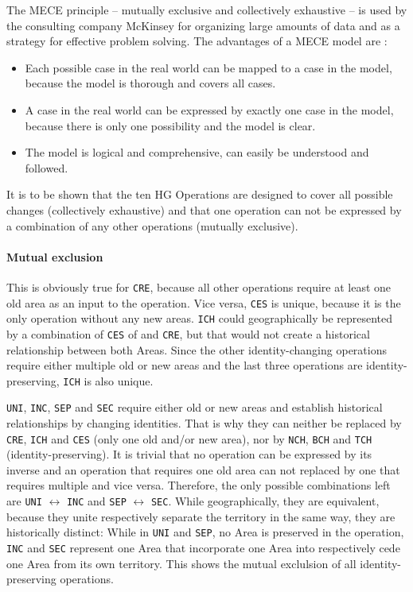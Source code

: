 The MECE principle -- mutually exclusive and collectively exhaustive -- is used by the consulting company McKinsey for organizing large amounts of data and as a strategy for effective problem solving. The advantages of a MECE model are \cite{mece}:
\begin{itemize}
  \item Each possible case in the real world can be mapped to a case in the model, because the model is thorough and covers all cases.
  \item A case in the real world can be expressed by exactly one case in the model, because there is only one possibility and the model is clear.
  \item The model is logical and comprehensive, can easily be understood and followed.
\end{itemize}

It is to be shown that the ten HG Operations are designed to cover all possible changes (collectively exhaustive) and that one operation can not be expressed by a combination of any other operations (mutually exclusive).


\paragraph{Mutual exclusion} %
\label{par:mutual_exclusion}

This is obviously true for \texttt{CRE}, because all other operations require at least one old area as an input to the operation. Vice versa, \texttt{CES} is unique, because it is the only operation without any new areas. \texttt{ICH} could geographically be represented by a combination of \texttt{CES} of and \texttt{CRE}, but that would not create a historical relationship between both Areas. Since the other identity-changing operations require either multiple old or new areas and the last three operations are identity-preserving, \texttt{ICH} is also unique.

\texttt{UNI}, \texttt{INC}, \texttt{SEP} and \texttt{SEC} require either old or new areas and establish historical relationships by changing identities. That is why they can neither be replaced by \texttt{CRE}, \texttt{ICH} and \texttt{CES} (only one old and/or new area), nor by \texttt{NCH}, \texttt{BCH} and \texttt{TCH} (identity-preserving). It is trivial that no operation can be expressed by its inverse and an operation that requires one old area can not replaced by one that requires multiple and vice versa. Therefore, the only possible combinations left are \texttt{UNI} $\leftrightarrow$ \texttt{INC} and \texttt{SEP} $\leftrightarrow$ \texttt{SEC}. While geographically, they are equivalent, because they unite respectively separate the territory in the same way, they are historically distinct: While in \texttt{UNI} and \texttt{SEP}, no Area is preserved in the operation, \texttt{INC} and \texttt{SEC} represent one Area that incorporate one Area into respectively cede one Area from its own territory. This shows the mutual exclulsion of all identity-preserving operations.

